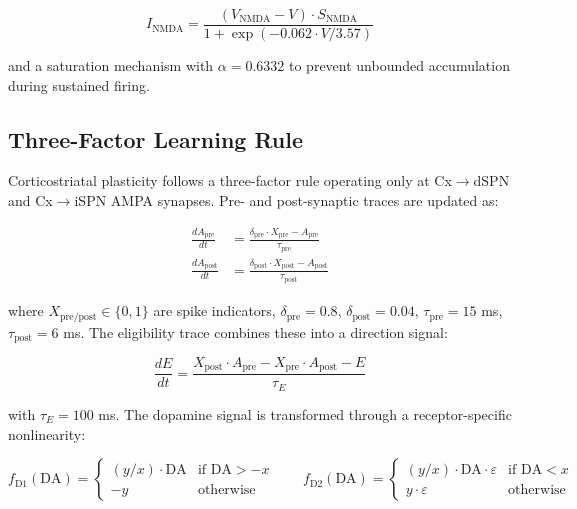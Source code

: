 \documentclass[11pt,a4paper]{article}
\begin{document}
\begin{equation}
I_{\text{NMDA}} = \frac{(V_{\text{NMDA}} - V) \cdot S_{\text{NMDA}}}{1 + \exp(-0.062 \cdot V / 3.57)}
\end{equation}

and a saturation mechanism with $\alpha = 0.6332$ to prevent unbounded accumulation during sustained firing.

\subsection{Three-Factor Learning Rule}

Corticostriatal plasticity follows a three-factor rule operating only at Cx$\rightarrow$dSPN and Cx$\rightarrow$iSPN AMPA synapses. Pre- and post-synaptic traces are updated as:

\begin{align}
\frac{dA_{\text{pre}}}{dt} &= \frac{\delta_{\text{pre}} \cdot X_{\text{pre}} - A_{\text{pre}}}{\tau_{\text{pre}}} \\
\frac{dA_{\text{post}}}{dt} &= \frac{\delta_{\text{post}} \cdot X_{\text{post}} - A_{\text{post}}}{\tau_{\text{post}}}
\end{align}

where $X_{\text{pre/post}} \in \{0,1\}$ are spike indicators, $\delta_{\text{pre}} = 0.8$, $\delta_{\text{post}} = 0.04$, $\tau_{\text{pre}} = 15$ ms, $\tau_{\text{post}} = 6$ ms. The eligibility trace combines these into a direction signal:

\begin{equation}
\frac{dE}{dt} = \frac{X_{\text{post}} \cdot A_{\text{pre}} - X_{\text{pre}} \cdot A_{\text{post}} - E}{\tau_E}
\end{equation}

with $\tau_E = 100$ ms. The dopamine signal is transformed through a receptor-specific nonlinearity:

\begin{equation}
f_{\text{D1}}(\text{DA}) = \begin{cases} (y/x) \cdot \text{DA} & \text{if DA} > -x \\ -y & \text{otherwise} \end{cases}
\quad\quad
f_{\text{D2}}(\text{DA}) = \begin{cases} (y/x) \cdot \text{DA} \cdot \varepsilon & \text{if DA} < x \\ y \cdot \varepsilon & \text{otherwise} \end{cases}
\end{equation}
\end{document}
